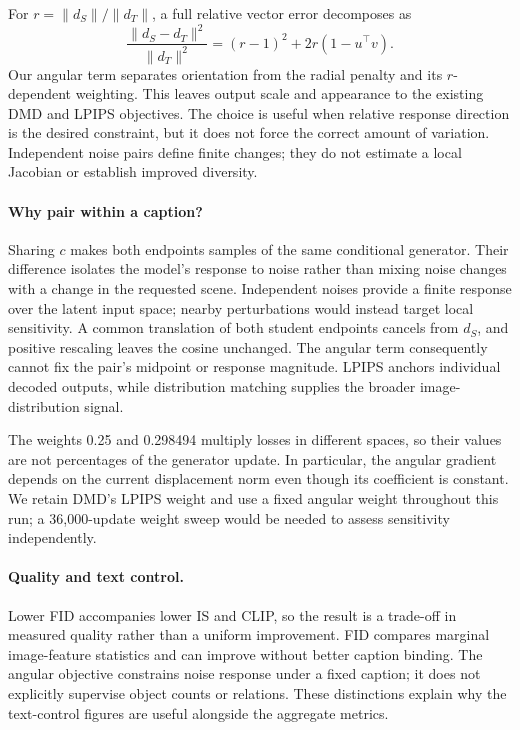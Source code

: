 \documentclass[10pt,twocolumn,letterpaper]{article}
\begin{document}
For $r=\|d_S\|/\|d_T\|$, a full relative vector error decomposes as
\begin{equation}
\frac{\|d_S-d_T\|^2}{\|d_T\|^2}
=(r-1)^2+2r(1-u^\top v).
\end{equation}
Our angular term separates orientation from the radial penalty and its
$r$-dependent weighting. This leaves output scale and appearance to the
existing DMD and LPIPS objectives. The choice is useful when relative
response direction is the desired constraint, but it does not force the
correct amount of variation. Independent noise pairs define finite changes;
they do not estimate a local Jacobian or establish improved diversity.

\paragraph{Why pair within a caption?}
Sharing $c$ makes both endpoints samples of the same conditional generator.
Their difference isolates the model's response to noise rather than mixing
noise changes with a change in the requested scene. Independent noises
provide a finite response over the latent input space; nearby perturbations
would instead target local sensitivity. A common translation of both
student endpoints cancels from $d_S$, and positive rescaling leaves the
cosine unchanged. The angular term consequently cannot fix the pair's
midpoint or response magnitude. LPIPS anchors individual decoded outputs,
while distribution matching supplies the broader image-distribution signal.

The weights 0.25 and 0.298494 multiply losses in different spaces, so their
values are not percentages of the generator update. In particular, the
angular gradient depends on the current displacement norm even though its
coefficient is constant. We retain DMD's LPIPS weight and use a fixed
angular weight throughout this run; a 36,000-update weight sweep would be
needed to assess sensitivity independently.

\paragraph{Quality and text control.}
Lower FID accompanies lower IS and CLIP, so the result is a trade-off in
measured quality rather than a uniform improvement. FID compares marginal
image-feature statistics and can improve without better caption binding.
The angular objective constrains noise response under a fixed caption;
it does not explicitly supervise object counts or relations. These
distinctions explain why the text-control figures are useful alongside
the aggregate metrics.
\end{document}
